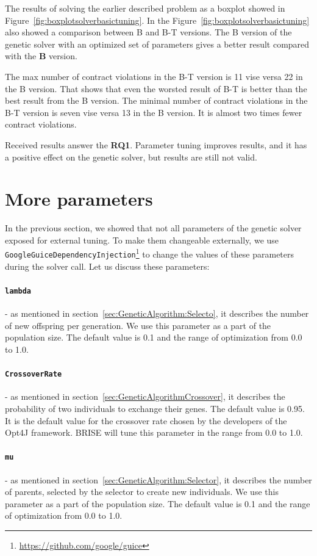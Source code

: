 The results of solving the earlier described problem as a boxplot showed in Figure~\ref{fig:boxplotsolverbasictuning}. In the Figure~\ref{fig:boxplotsolverbasictuning} also showed a comparison between B and B-T versions.  The B version of the genetic solver with an optimized set of parameters gives a better result compared with the \textbf{B} version.

The max number of contract violations in the B-T version is 11 vise versa 22 in the B version. That shows that even the worsted result of B-T is better than the best result from the B version. The minimal number of contract violations in the B-T version is seven vise versa 13 in the B version. It is almost two times fewer contract violations. 

Received results answer the \textbf{RQ1}. Parameter tuning improves results, and it has a positive effect on the genetic solver, but results are still not valid. 

\section{More parameters}

In the previous section, we showed that not all parameters of the genetic solver exposed for external tuning. To make them changeable externally, we use \texttt{GoogleGuiceDependencyInjection}\footnote{\url{https://github.com/google/guice}} to change the values of these parameters during the solver call. Let us discuss these parameters:
\paragraph{\texttt{lambda}} - as mentioned in section~\ref{sec:GeneticAlgorithm:Selecto}, it describes the number of new offspring per generation. We use this parameter as a part of the population size.
The default value is 0.1 and the range of optimization from 0.0 to 1.0.
\paragraph{\texttt{CrossoverRate}} - as mentioned in section~\ref{sec:GeneticAlgorithmCrossover}, it describes the probability of two individuals to exchange their genes. The default value is 0.95. It is the default value for the crossover rate chosen by the developers of the Opt4J framework. BRISE will tune this parameter in the range from 0.0 to 1.0.
\paragraph{\texttt{mu}} - as mentioned in section~\ref{sec:GeneticAlgorithm:Selector}, it describes the number of parents, selected by the selector to create new individuals. We use this parameter as a part of the population size.
The default value is 0.1 and the range of optimization from 0.0 to 1.0.
